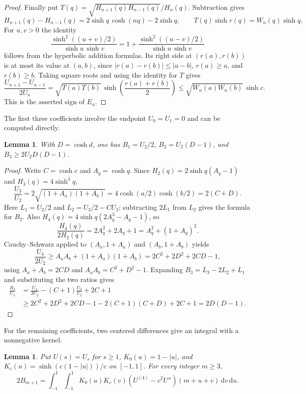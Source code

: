 \documentclass[10pt,twoside,reqno]{amsart}
\newtheorem{lemma}[proposition]{Lemma}
\numberwithin{equation}{section}
\newcommand{\dd}{\,\mathrm{d}}
\begin{document}
\begin{proof}
Finally put \(T(q)=\sqrt{H_{n+1}(q)H_{n-1}(q)}/H_n(q)\). Subtraction gives
\[
 H_{n+1}(q)-H_{n-1}(q)
 =2\sinh q\,\cosh(nq)-2\sinh q,\qquad
 T(q)\sinh r(q)=W_n(q)\sinh q.
\]
For \(u,v>0\) the identity
\[
 \frac{\sinh^2((u+v)/2)}{\sinh u\,\sinh v}
 =1+\frac{\sinh^2((u-v)/2)}{\sinh u\,\sinh v}
\]
follows from the hyperbolic addition formulas. Its right side at
\((r(a),r(b))\) is at most its value at \((a,b)\), since
\(|r(a)-r(b)|\le|a-b|\), \(r(a)\ge a\), and \(r(b)\ge b\).
Taking square roots and using the identity for \(T\) gives
\[
 \frac{U_{n+1}-U_{n-1}}{2U_n}
 =\sqrt{T(a)T(b)}\,\sinh\!\left(\frac{r(a)+r(b)}2\right)
 \le\sqrt{W_n(a)W_n(b)}\,\sinh c .
\]
This is the asserted sign of \(E_n\).
\end{proof}

The first three coefficients involve the endpoint \(U_0=U_1=0\) and
can be computed directly.

\begin{lemma}\label{lem:first}
With \(D=\cosh d\), one has
\(B_1=U_2/2\), \(B_2=U_2(D-1)\), and \(B_3\ge2U_2D(D-1)\).
\end{lemma}

\begin{proof}
Write \(C=\cosh c\) and \(A_q=\cosh q\). Since
\(H_2(q)=2\sinh q(A_q-1)\) and \(H_3(q)=4\sinh^3 q\),
\[
 \frac{U_3}{U_2}
 =2\sqrt{(1+A_a)(1+A_b)}
 =4\cosh(a/2)\cosh(b/2)=2(C+D).
\]
Here \(L_1=U_2/2\) and \(L_2=U_3/2-CU_2\); subtracting \(2L_1\) from
\(L_2\) gives the formula for \(B_2\).
Also \(H_4(q)=4\sinh q(2A_q^3-A_q-1)\), so
\[
 \frac{H_4(q)}{2H_2(q)}
 =2A_q^2+2A_q+1=A_q^2+(1+A_q)^2 .
\]
Cauchy--Schwarz applied to \((A_a,1+A_a)\) and \((A_b,1+A_b)\) yields
\[
 \frac{U_4}{2U_2}\ge A_aA_b+(1+A_a)(1+A_b)
 =2C^2+2D^2+2CD-1,
\]
using \(A_a+A_b=2CD\) and \(A_aA_b=C^2+D^2-1\).
Expanding \(B_3=L_3-2L_2+L_1\) and substituting the two ratios gives
\begin{align*}
 \frac{B_3}{U_2}
 &=\frac{U_4}{2U_2}-(C+1)\frac{U_3}{U_2}+2C+1\\
 &\ge 2C^2+2D^2+2CD-1-2(C+1)(C+D)+2C+1=2D(D-1).
\end{align*}
\end{proof}

For the remaining coefficients, two centered differences give an integral
with a nonnegative kernel.

\begin{lemma}\label{lem:integral}
Put \(U(s)=U_s\) for \(s\ge1\), \(K_0(u)=1-|u|\), and
\(K_c(u)=\sinh(c(1-|u|))/c\) on \([-1,1]\). For every integer \(m\ge3\),
\begin{equation}\label{eq:integral}
 2B_{m+1}=\int_{-1}^1\int_{-1}^1 K_0(u)K_c(v)
       (U^{(4)}-c^2U'')(m+u+v)\dd v\dd u .
\end{equation}
\end{lemma}
\end{document}
